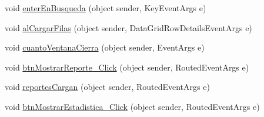 \begin{DoxyCompactItemize}
\item 
void \hyperlink{class_proyecto___integrador__3_1_1_reportes_1_1_reporte_por_unidad_a3965bfac35f8e53f236290444f0b5ae0}{enter\-En\-Busqueda} (object sender, Key\-Event\-Args e)
\item 
void \hyperlink{class_proyecto___integrador__3_1_1_reportes_1_1_reporte_por_unidad_a6a023ef0a8af7d2b757be59812ab6794}{al\-Cargar\-Filas} (object sender, Data\-Grid\-Row\-Details\-Event\-Args e)
\item 
void \hyperlink{class_proyecto___integrador__3_1_1_reportes_1_1_reporte_por_unidad_ae63c200c48bd2241d5315399ce06d949}{cuanto\-Ventana\-Cierra} (object sender, Event\-Args e)
\item 
void \hyperlink{class_proyecto___integrador__3_1_1_reportes_1_1_reporte_por_unidad_ae569374d459c742dcff245425c157e32}{btn\-Mostrar\-Reporte\-\_\-\-Click} (object sender, Routed\-Event\-Args e)
\item 
void \hyperlink{class_proyecto___integrador__3_1_1_reportes_1_1_reporte_por_unidad_ab5dbb9981831ad860dc35a5168a7409a}{reportes\-Cargan} (object sender, Routed\-Event\-Args e)
\item 
void \hyperlink{class_proyecto___integrador__3_1_1_reportes_1_1_reporte_por_unidad_a574153d6bf4fd1ec16f9ae0c77b70e90}{btn\-Mostrar\-Estadistica\-\_\-\-Click} (object sender, Routed\-Event\-Args e)
\end{DoxyCompactItemize}
